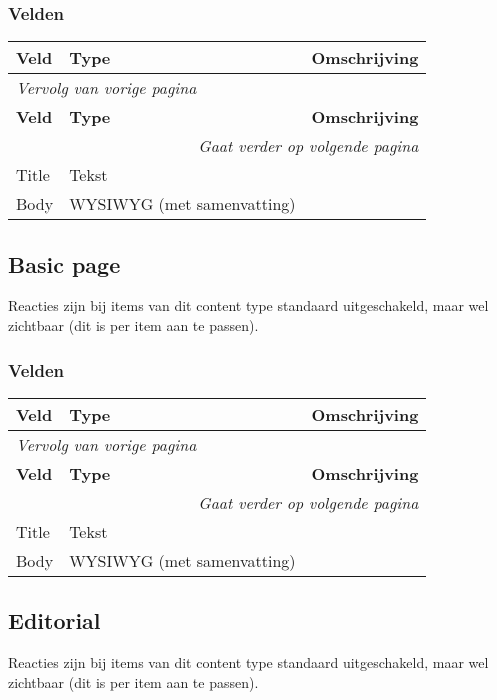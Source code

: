 \subsubsection{Velden}
  \begin{longtable}{| p{3.75cm}|p{3.75cm}|p{7.50cm}|}
  \hline
  \rowcolor{tableheader}
  \textbf{Veld} & \textbf{Type} & \textbf{Omschrijving}  \tabularnewline
  \hline
\endfirsthead
\multicolumn{3}{l}{\textit{Vervolg van vorige pagina}} \\
\hline
\rowcolor{tableheader}
  \textbf{Veld} & \textbf{Type} & \textbf{Omschrijving}  \tabularnewline
  \hline
\hline
\endhead
\multicolumn{3}{r}{\textit{Gaat verder op volgende pagina}} \\
\endfoot
\hline
\endlastfoot
  \raggedright{Title} & \raggedright{Tekst} & \raggedright{}  \tabularnewline
  \hline
  \raggedright{Body} & \raggedright{WYSIWYG (met samenvatting)} & \raggedright{}  \tabularnewline
  \hline
  \end{longtable}

\subsection{Basic page}
\label{sec:content-basic page}
Reacties zijn bij items van dit content type standaard uitgeschakeld, maar wel zichtbaar (dit is per item aan te passen).

\subsubsection{Velden}
  \begin{longtable}{| p{3.75cm}|p{3.75cm}|p{7.50cm}|}
  \hline
  \rowcolor{tableheader}
  \textbf{Veld} & \textbf{Type} & \textbf{Omschrijving}  \tabularnewline
  \hline
\endfirsthead
\multicolumn{3}{l}{\textit{Vervolg van vorige pagina}} \\
\hline
\rowcolor{tableheader}
  \textbf{Veld} & \textbf{Type} & \textbf{Omschrijving}  \tabularnewline
  \hline
\hline
\endhead
\multicolumn{3}{r}{\textit{Gaat verder op volgende pagina}} \\
\endfoot
\hline
\endlastfoot
  \raggedright{Title} & \raggedright{Tekst} & \raggedright{}  \tabularnewline
  \hline
  \raggedright{Body} & \raggedright{WYSIWYG (met samenvatting)} & \raggedright{}  \tabularnewline
  \hline
  \end{longtable}

\subsection{Editorial}
\label{sec:content-editorial}
Reacties zijn bij items van dit content type standaard uitgeschakeld, maar wel zichtbaar (dit is per item aan te passen).

